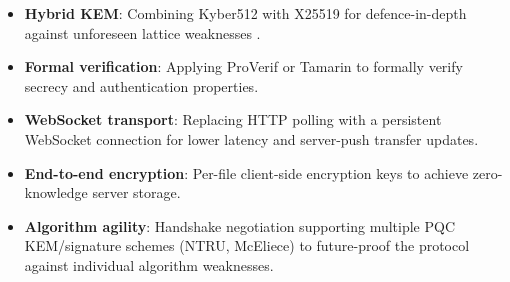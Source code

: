 \begin{itemize}
  \item \textbf{Hybrid KEM}: Combining Kyber512 with X25519 for
        defence-in-depth against unforeseen lattice weaknesses
        \cite{chen2022hybridtls}.
  \item \textbf{Formal verification}: Applying ProVerif or Tamarin
        to formally verify secrecy and authentication properties.
  \item \textbf{WebSocket transport}: Replacing HTTP polling with
        a persistent WebSocket connection for lower latency and
        server-push transfer updates.
  \item \textbf{End-to-end encryption}: Per-file client-side
        encryption keys to achieve zero-knowledge server storage.
  \item \textbf{Algorithm agility}: Handshake negotiation supporting
        multiple PQC KEM/signature schemes (NTRU, McEliece) to future-proof
        the protocol against individual algorithm weaknesses.
\end{itemize}
